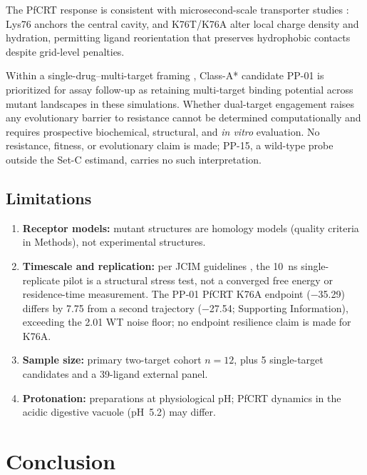 \documentclass[journal=jcisd8,manuscript=article,layout=traditional]{achemso}
\begin{document}
The PfCRT response is consistent with microsecond-scale transporter studies \citep{tanner2025pfcrt}: Lys76 anchors the central cavity, and K76T/K76A alter local charge density and hydration, permitting ligand reorientation that preserves hydrophobic contacts despite grid-level penalties.

Within a single-drug--multi-target framing \citep{polypharmacology_malaria_2026}, Class-A* candidate PP-01 is prioritized for assay follow-up as retaining multi-target binding potential across mutant landscapes in these simulations. Whether dual-target engagement raises any evolutionary barrier to resistance cannot be determined computationally and requires prospective biochemical, structural, and \textit{in vitro} evaluation. No resistance, fitness, or evolutionary claim is made; PP-15, a wild-type probe outside the Set-C estimand, carries no such interpretation.

\subsection{Limitations}

\begin{enumerate}
    \item \textbf{Receptor models:} mutant structures are homology models (quality criteria in Methods), not experimental structures.
    \item \textbf{Timescale and replication:} per JCIM guidelines \citep{soares2023mdreport}, the \qty{10}{\ns} single-replicate pilot is a structural stress test, not a converged free energy or residence-time measurement. The PP-01 PfCRT K76A endpoint (\qty{-35.29}{\kcalmol}) differs by \qty{7.75}{\kcalmol} from a second trajectory (\qty{-27.54}{\kcalmol}; Supporting Information), exceeding the \qty{2.01}{\kcalmol} WT noise floor; no endpoint resilience claim is made for K76A.
    \item \textbf{Sample size:} primary two-target cohort $n=\num{12}$, plus 5 single-target candidates and a 39-ligand external panel.
    \item \textbf{Protonation:} preparations at physiological pH; PfCRT dynamics in the acidic digestive vacuole (pH~\num{5.2}) may differ.
\end{enumerate}


\section{Conclusion}
\end{document}
